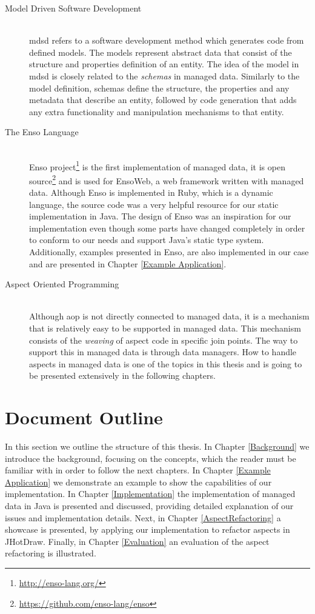 \begin{description}
  \item[Model Driven Software Development]~\\
  \ac{mdsd} refers to a software development method which generates code from defined models. 
  The models represent abstract data that consist of the structure and properties definition of an entity.
  The idea of the model in \ac{mdsd} is closely related to the \textit{schemas} in managed data.
  Similarly to the model definition, schemas define the structure, the properties and any metadata that describe an entity, followed by code generation that adds any extra functionality and manipulation mechanisms to that entity.

  \item[The Enso Language]~\\
  Enso project\footnote{\url{http://enso-lang.org/}} is the first implementation of managed data, 
  it is open source\footnote{\url{https://github.com/enso-lang/enso}} and is used for EnsoWeb, a web framework written with managed data.
  Although Enso is implemented in Ruby, which is a dynamic language, the source code was a very helpful resource for our static implementation in Java. 
  The design of Enso was an inspiration for our implementation even though some parts have changed completely in order to conform to our needs and support Java's static type system.
  Additionally, examples presented in Enso, are also implemented in our case and are presented in Chapter \ref{Example Application}.

  \item[Aspect Oriented Programming]~\\
  Although \ac{aop} is not directly connected to managed data, it is a mechanism that is relatively easy to be supported in managed data.
  This mechanism consists of the \textit{weaving} of aspect code in specific join points. 
  The way to support this in managed data is through data managers. 
  How to handle aspects in managed data is one of the topics in this thesis and is going to be presented extensively in the following chapters.

\end{description}

\section{Document Outline}\label{Document Outline}
In this section we outline the structure of this thesis. 
In Chapter \ref{Background} we introduce the background, focusing on the concepts, which the reader must be familiar with in order to follow the next chapters.
In Chapter \ref{Example Application} we demonstrate an example to show the capabilities of our implementation.
In Chapter \ref{Implementation} the implementation of managed data in Java is presented and discussed, providing detailed explanation of our issues and implementation details.
Next, in Chapter \ref{AspectRefactoring} a showcase is presented, by applying our implementation to refactor aspects in JHotDraw.
Finally, in Chapter \ref{Evaluation} an evaluation of the aspect refactoring is illustrated.

